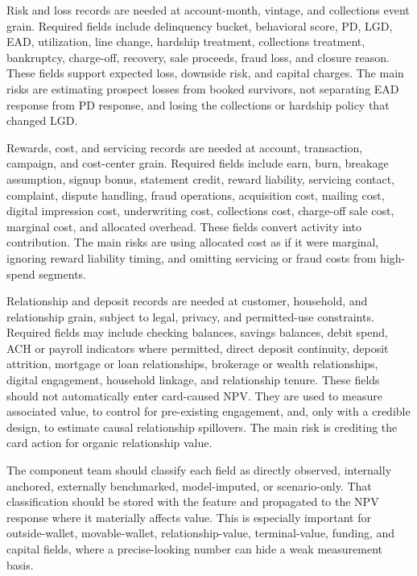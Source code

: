 \documentclass[11pt]{article}
\newcommand{\1}{\mathbf{1}}
\begin{document}
Risk and loss records are needed at account-month, vintage, and collections
event grain. Required fields include delinquency bucket, behavioral score,
PD, LGD, EAD, utilization, line change, hardship treatment, collections
treatment, bankruptcy, charge-off, recovery, sale proceeds, fraud loss, and
closure reason. These fields support expected loss, downside risk, and capital
charges. The main risks are estimating prospect losses from booked survivors,
not separating EAD response from PD response, and losing the collections or
hardship policy that changed LGD.

Rewards, cost, and servicing records are needed at account, transaction,
campaign, and cost-center grain. Required fields include earn, burn, breakage
assumption, signup bonus, statement credit, reward liability, servicing
contact, complaint, dispute handling, fraud operations, acquisition cost,
mailing cost, digital impression cost, underwriting cost, collections cost,
charge-off sale cost, marginal cost, and allocated overhead. These fields
convert activity into contribution. The main risks are using allocated cost as
if it were marginal, ignoring reward liability timing, and omitting servicing
or fraud costs from high-spend segments.

Relationship and deposit records are needed at customer, household, and
relationship grain, subject to legal, privacy, and permitted-use constraints.
Required fields may include checking balances, savings balances, debit spend,
ACH or payroll indicators where permitted, direct deposit continuity,
deposit attrition, mortgage or loan relationships, brokerage or wealth
relationships, digital engagement, household linkage, and relationship tenure.
These fields should not automatically enter card-caused NPV. They are used to
measure associated value, to control for pre-existing engagement, and, only
with a credible design, to estimate causal relationship spillovers. The main
risk is crediting the card action for organic relationship value.

The component team should classify each field as directly observed,
internally anchored, externally benchmarked, model-imputed, or scenario-only.
That classification should be stored with the feature and propagated to the
NPV response where it materially affects value. This is especially important
for outside-wallet, movable-wallet, relationship-value, terminal-value,
funding, and capital fields, where a precise-looking number can hide a weak
measurement basis.
\end{document}
